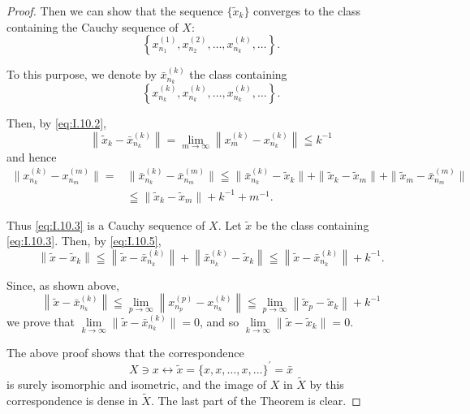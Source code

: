 \begin{proof}
Then we can show that the sequence $\{\tilde{x}_k\}$ converges to the class containing the Cauchy sequence of $X$: 
\begin{equation}\label{eq:I.10.3}
\left\{x_ {n_{1}} ^{(1)}, x_ {n_{2}} ^{(2)}, \dots , x_ {n_{k}} ^{(k)}, \dots \right\}.
\end{equation}

To this purpose, we denote by $\bar{x}_{n_{k}}^{(k)}$ the class containing 
\begin{equation}\label{eq:I.10.4}
\left\{x_ {n_{k}} ^{(k)}, x_ {n_{k}} ^{(k)}, \ldots , x_ {n_{k}} ^{(k)}, \ldots \right\}.
\end{equation}

Then, by \eqref{eq:I.10.2}, 
\begin{equation}\label{eq:I.10.5}
\left\| \tilde {x}_{k}- \bar {x}_ {n_{k}} ^{(k)} \right\| = \lim\limits_{m \rightarrow \infty} \left\| x_{m} ^{(k)}- x_ {n_{k}} ^{(k)} \right\| \leqq k ^{-1}
\end{equation}
and hence 
\[
\begin{aligned} \| x_ {n_{k}} ^{(k)}- x_ {n_{m}} ^{(m)} \| = & \| \bar {x}_ {n_{k}} ^{(k)}- \bar {x}_ {n_{m}} ^{(m)} \| \leqq \| \bar {x}_ {n_{k}} ^{(k)}- \tilde {x}_{k} \| + \| \tilde {x}_{k}- \tilde {x}_{m} \| + \| \tilde {x}_{m}- \bar {x}_ {n_{m}} ^{(m)} \| \\ & \leqq \| \tilde {x}_{k}- \tilde {x}_{m} \| + k ^{-1} + m ^{-1}. \end{aligned}
\]

Thus \eqref{eq:I.10.3} is a Cauchy sequence of $X$. Let $\tilde{x}$ be the class containing \eqref{eq:I.10.3}. Then, by \eqref{eq:I.10.5}, 
\[
\left\| \tilde {x}- \tilde {x}_{k} \right\| \leqq \left\| \tilde {x}- \bar {x}_ {n_{k}} ^{(k)} \right\| + \left\| \bar {x}_ {n_{k}} ^{(k)}- \tilde {x}_{k} \right\| \leqq \left\| \tilde {x}- \bar {x}_ {n_{k}} ^{(k)} \right\| + k ^{-1}.
\]

Since, as shown above, 
\[
\left\| \tilde {x}- \bar {x}_ {n_{k}} ^{(k)} \right\| \leqq \lim\limits_{p\rightarrow \infty} \left\| x_ {n_{p}} ^{(p)}- x_ {n_{k}} ^{(k)} \right\| \leqq \lim\limits_{p\rightarrow \infty} \left\| \tilde {x}_{p}- \tilde {x}_{k} \right\| + k ^{-1}
\]
we prove that $\lim\limits_{k\to \infty}\|\tilde{x}-\bar{x}_{n_{k}}^{(k)}\| = 0$, and so $\lim\limits_{k\to \infty}\|\tilde{x}-\tilde{x}_k\| = 0.$ 

The above proof shows that the correspondence 
\[
X \ni x \leftrightarrow \tilde {x} = \{x, x, \dots , x, \dots \} ^{\prime} = \bar {x}
\]
is surely isomorphic and isometric, and the image of $X$ in $\tilde{X}$ by this correspondence is dense in $\tilde{X}$. The last part of the Theorem is clear.
\end{proof}

